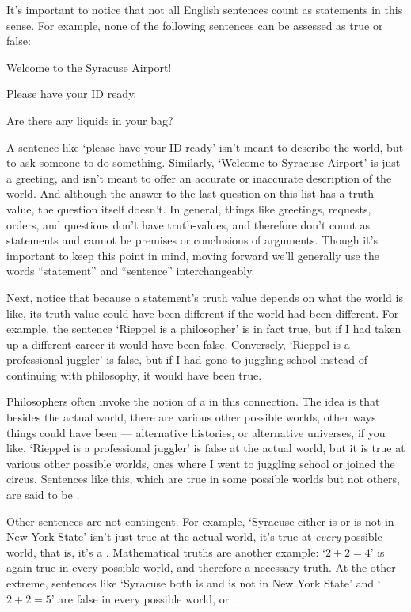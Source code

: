 It's important to notice that not all English sentences count as statements in this sense.  For example, none of the following sentences can be assessed as true or false:

\begin{ebullet}
\item Welcome to the Syracuse Airport! 
\item Please have your ID ready.
\item Are there any liquids in your bag?
\end{ebullet}

A sentence like `please have your ID ready' isn't meant to describe the world, but to ask someone to do something.  Similarly, `Welcome to Syracuse Airport' is just a greeting, and isn't meant to offer an accurate or inaccurate description of the world.  And although the answer to the last question on this list has a truth-value, the question itself doesn't.  In general, things like greetings, requests, orders, and questions don't have truth-values, and therefore don't count as statements and cannot be premises or conclusions of arguments.  Though it's important to keep this point in mind, moving forward we'll generally use the words ``statement'' and ``sentence'' interchangeably.


Next, notice that because a statement's truth value depends on what the world is like, its truth-value could have been different if the world had been different.  For example, the sentence `Rieppel is a philosopher' is in fact true, but if I had taken up a different career it would have been false.  Conversely, `Rieppel is a professional juggler' is false, but if I had gone to juggling school instead of continuing with philosophy, it would have been true.   

Philosophers often invoke the notion of a  in this connection.  The idea is that besides the actual world, there are various other possible worlds, other ways things could have been --- alternative histories, or alternative universes, if you like.  `Rieppel is a professional juggler' is false at the actual world, but it is true at various other possible worlds, ones where I went to juggling school or joined the circus.  Sentences like this, which are true in some possible worlds but not others, are said to be .

Other sentences are not contingent.  For example, `Syracuse either is or is not in New York State' isn't just true at the actual world, it's true at \emph{every} possible world, that is, it's a .  Mathematical truths are another example: `$2+2 = 4$' is again true in every possible world, and therefore a necessary truth. At the other extreme, sentences like `Syracuse both is and is not in New York State'  and `$2+2 = 5$' are false in every possible world, or .  

